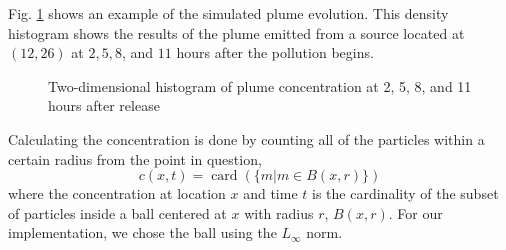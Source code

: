 \documentclass[ letterpaper, 10 pt, conference]{ieeeconf}  %
\DeclareMathOperator{\card}{card}
\begin{document}
Fig. \ref{pic:framesByTime} shows an example of the simulated plume evolution.  This density histogram shows the results of the plume emitted from a source located at $(12,26)$ at $2, 5, 8$, and $11$ hours after the pollution begins. 
\begin{figure}[thpb]
      \centering
      \caption{Two-dimensional histogram of plume concentration at 2, 5, 8, and 11 hours after release}
   \label{pic:framesByTime}
 \end{figure}

Calculating the concentration is done by counting all of the particles within a certain radius from the point in question,
	\begin{equation}\label{eq:concentration}
	c(x,t) =  \card({\{m | m \in B(x,r)\}}) 
	\end{equation}
where the concentration at location $x$ and time $t$ is the cardinality of the subset of particles inside a ball centered at $x$ with radius $r$, $B(x,r)$.   For our implementation, we chose the ball using the $L_{\infty}$ norm.  %
\end{document}
